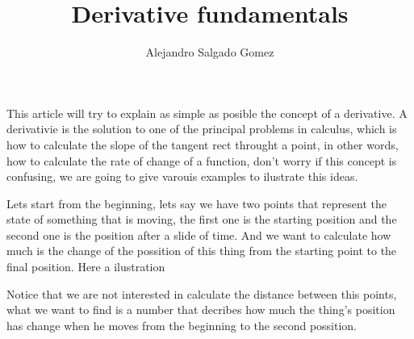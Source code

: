 \documentclass[12pt,journal]{IEEEtran}
\begin{document}
    \title{Derivative fundamentals}
    \author{Alejandro Salgado Gomez}

    \maketitle

    This article will try to explain as simple as posible the concept of a
    derivative. A derivativie is the solution to one of the principal
    problems in calculus, which is how to calculate the slope of the tangent
    rect throught a point, in other words, how to calculate the rate of change
    of a function, don't worry if this concept is confusing, we are going to
    give varouis examples to ilustrate this ideas.

    Lets start from the beginning, lets say we have two points that represent
    the state of something that is moving, the first one is the starting
    position and the second one is the position after a slide of time. And we
    want to calculate how much is the change of the possition of this thing
    from the starting point to the final position. Here a ilustration\\


    Notice that we are not interested in calculate the distance between this
    points, what we want to find is a number that decribes how much the thing's
    position has change when he moves from the beginning to the second possition.
\end{document}
